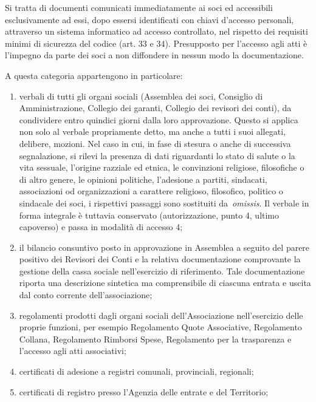 Si tratta di documenti comunicati immediatamente ai soci ed accessibili
esclusivamente ad essi, dopo essersi identificati con chiavi d'accesso
personali, attraverso un sistema informatico ad accesso controllato, nel
rispetto dei requisiti minimi di sicurezza del codice (art. 33 e 34).
Presupposto per l'accesso agli atti \`e l'impegno da parte dei soci a non
diffondere in nessun modo la documentazione.  

A questa categoria appartengono in particolare:

\begin{enumerate}
    \item verbali di tutti gli organi sociali (Assemblea dei soci, Consiglio
        di Amministrazione, Collegio dei garanti, Collegio dei revisori dei
        conti), da condividere entro quindici giorni dalla loro
        approvazione. Questo si applica non solo al verbale propriamente
        detto, ma anche a tutti i suoi allegati, delibere, mozioni.
        Nel caso in cui, in fase di stesura o anche di successiva segnalazione, si
        rilevi la presenza di dati riguardanti lo stato di salute o la vita
        sessuale, l'origine razziale ed etnica, le convinzioni religiose,
        filosofiche o di altro genere, le opinioni politiche, l'adesione a partiti,
        sindacati, associazioni od organizzazioni a carattere religioso, filosofico,
        politico o sindacale dei soci, i rispettivi passaggi sono sostituiti
        da \emph{omissis}. Il verbale in forma integrale \`e tuttavia conservato
        (autorizzazione, punto 4, ultimo capoverso) e passa in modalit\`a di accesso
        4;
    \item il bilancio consuntivo posto in approvazione in Assemblea a seguito
        del parere positivo dei Revisori dei Conti e la relativa
        documentazione comprovante la gestione della cassa sociale
        nell'esercizio di riferimento. Tale documentazione riporta
        una descrizione sintetica ma comprensibile di ciascuna entrata e
        uscita dal conto corrente dell'associazione;
    \item regolamenti prodotti dagli organi sociali dell'Associazione
        nell'esercizio delle proprie funzioni, per esempio Regolamento Quote
        Associative, Regolamento Collana, Regolamento Rimborsi Spese,
        Regolamento per la trasparenza e l'accesso agli atti associativi;
    \item certificati di adesione a registri comunali, provinciali, regionali;
    \item certificati di registro presso l'Agenzia delle entrate e del Territorio;

\end{enumerate}
